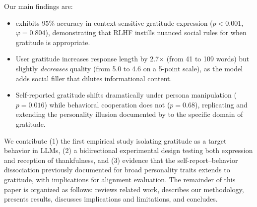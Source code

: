 Our main findings are:
\begin{itemize}[leftmargin=*,itemsep=0pt,topsep=0pt]
    \item \gptfour exhibits 95\% accuracy in context-sensitive gratitude expression ($p < 0.001$, $\varphi = 0.804$), demonstrating that RLHF instills nuanced social rules for when gratitude is appropriate.
    \item User gratitude increases response length by 2.7$\times$ (from 41 to 109 words) but slightly \emph{decreases} quality (from 5.0 to 4.6 on a 5-point scale), as the model adds social filler that dilutes informational content.
    \item Self-reported gratitude shifts dramatically under persona manipulation ($p = 0.016$) while behavioral cooperation does not ($p = 0.68$), replicating and extending the personality illusion documented by \citet{han2025personality} to the specific domain of gratitude.
\end{itemize}

We contribute (1) the first empirical study isolating gratitude as a target behavior in LLMs, (2) a bidirectional experimental design testing both expression and reception of thankfulness, and (3) evidence that the self-report--behavior dissociation previously documented for broad personality traits extends to gratitude, with implications for alignment evaluation. The remainder of this paper is organized as follows:  reviews related work,  describes our methodology,  presents results,  discusses implications and limitations, and  concludes.